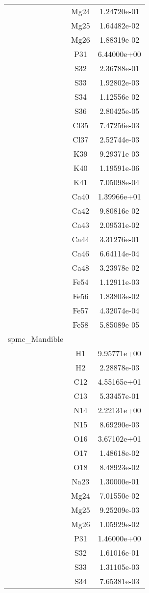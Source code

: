 \begin{centering}
\begin{longtable}{l c c}
& Mg24 & 1.24720e-01 \\ 
& Mg25 & 1.64482e-02 \\ 
& Mg26 & 1.88319e-02 \\ 
& P31 & 6.44000e+00 \\ 
& S32 & 2.36788e-01 \\ 
& S33 & 1.92802e-03 \\ 
& S34 & 1.12556e-02 \\ 
& S36 & 2.80425e-05 \\ 
& Cl35 & 7.47256e-03 \\ 
& Cl37 & 2.52744e-03 \\ 
& K39 & 9.29371e-03 \\ 
& K40 & 1.19591e-06 \\ 
& K41 & 7.05098e-04 \\ 
& Ca40 & 1.39966e+01 \\ 
& Ca42 & 9.80816e-02 \\ 
& Ca43 & 2.09531e-02 \\ 
& Ca44 & 3.31276e-01 \\ 
& Ca46 & 6.64114e-04 \\ 
& Ca48 & 3.23978e-02 \\ 
& Fe54 & 1.12911e-03 \\ 
& Fe56 & 1.83803e-02 \\ 
& Fe57 & 4.32074e-04 \\ 
& Fe58 & 5.85089e-05 \\ 
\hline
spmc_Mandible & & \\
\hline
& H1 & 9.95771e+00 \\ 
& H2 & 2.28878e-03 \\ 
& C12 & 4.55165e+01 \\ 
& C13 & 5.33457e-01 \\ 
& N14 & 2.22131e+00 \\ 
& N15 & 8.69290e-03 \\ 
& O16 & 3.67102e+01 \\ 
& O17 & 1.48618e-02 \\ 
& O18 & 8.48923e-02 \\ 
& Na23 & 1.30000e-01 \\ 
& Mg24 & 7.01550e-02 \\ 
& Mg25 & 9.25209e-03 \\ 
& Mg26 & 1.05929e-02 \\ 
& P31 & 1.46000e+00 \\ 
& S32 & 1.61016e-01 \\ 
& S33 & 1.31105e-03 \\ 
& S34 & 7.65381e-03 \\ 

\end{longtable}
\end{centering}

